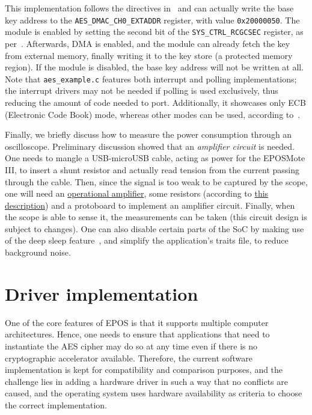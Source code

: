 \documentclass{../sftex/sftex}
\begin{document}
This implementation follows the directives in~\cite[Sec.
22.2.5.4.2.1]{Texas:report:2013:may} and can actually write the base key
address to the \verb!AES_DMAC_CH0_EXTADDR! register, with value
\verb!0x20000050!. The module is enabled by setting the second bit of the
\verb!SYS_CTRL_RCGCSEC! register, as per~\cite[Sec. 7.7.12, pp.
207]{Texas:report:2013:may}. Afterwards, DMA is enabled, and the module can
already fetch the key from external memory, finally writing it to the key store
(a protected memory region). If the module is disabled, the base key address
will not be written at all. Note that \verb!aes_example.c! features both
interrupt and polling implementations; the interrupt drivers may not be needed
if polling is used exclusively, thus reducing the amount of code needed to
port. Additionally, it showcases only ECB (Electronic Code Book) mode, whereas
other modes can be used, according to~\cite[Sec.
22.2.1.1.3]{Texas:report:2013:may}.

Finally, we briefly discuss how to measure the power consumption through an
oscilloscope. Preliminary discussion showed that an \emph{amplifier circuit} is
needed. One needs to mangle a USB-microUSB cable, acting as power for the
EPOSMote III, to insert a shunt resistor and actually read tension from the
current passing through the cable. Then, since the signal is too weak to be
captured by the scope, one will need an
\href{http://www.ti.com/product/TL074}{operational amplifier}, some resistors
(according to \href{http://epos.lisha.ufsc.br/dl675?display}{this description})
and a protoboard to implement an amplifier circuit. Finally, when the scope is
able to sense it, the measurements can be taken (this circuit design is subject
to changes). One can also disable certain parts of the SoC by making use of the
deep sleep feature~\cite[Sec. 3.5.1, pp. 132]{Texas:report:2013:may}, and
simplify the application's traits file, to reduce background noise.

\section{Driver implementation}

One of the core features of EPOS is that it supports multiple computer
architectures. Hence, one needs to ensure that applications that need to
instantiate the AES cipher may do so at any time even if there is no
cryptographic accelerator available. Therefore, the current software
implementation is kept for compatibility and comparison purposes, and the
challenge lies in adding a hardware driver in such a way that no conflicts are
caused, and the operating system uses hardware availability as criteria to
choose the correct implementation.
\end{document}
